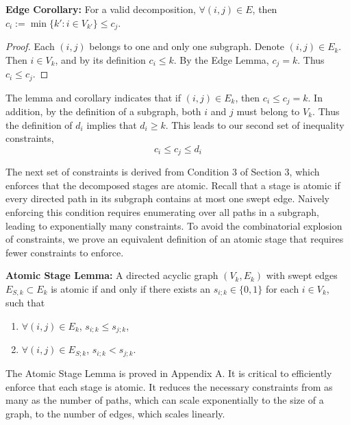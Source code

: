 \documentclass[review]{siamart0216}
\begin{document}
{\bf Edge Corollary:}  
For a valid decomposition,
$\forall (i,j)\in E$, then $c_i:=\min \{ k': i\in V_{k'}\}\le c_j$.

\begin{proof} Each $(i,j)$ belongs to one and only one subgraph.
Denote $(i,j)\in E_k$.  Then $i\in V_k$, and by its definition $c_i\le k$.
By the Edge Lemma, $c_j=k$.  Thus $c_i\le c_j$.
\end{proof}

The lemma and corollary indicates that if $(i,j)\in E_k$, then
$c_i\le c_j=k$.  In addition, by the definition of a subgraph,
both $i$ and $j$ must belong to $V_k$.  Thus the definition of $d_i$
implies that $d_i\ge k$.  This leads to our second set of inequality
constraints,
\begin{equation} \label{cond4}
    c_i \le c_j \le d_i
\end{equation}

The next set of constraints is derived from Condition 3 of Section 3,
which enforces that the decomposed stages are atomic.  Recall that a stage
is atomic if every directed path in its subgraph contains at most one
swept edge.  Naively enforcing this condition requires enumerating
over all paths in a subgraph, leading to exponentially many constraints.
To avoid the combinatorial explosion of constraints, we prove an equivalent
definition of an atomic stage that requires fewer constraints to enforce.

{\bf Atomic Stage Lemma:} 
A directed acyclic graph $(V_k, E_k)$ with swept edges $E_{S,k}\subset E_k$
is atomic if and only if there exists an $s_{i;k} \in \{0,1\}$ for each
$i\in V_k$,
such that
\begin{enumerate}
    \item $\forall (i,j)\in E_k$, $s_{i;k} \le s_{j;k}$,
    \item $\forall (i,j)\in E_{S;k}$, $s_{i;k} < s_{j;k}$.
\end{enumerate}

The Atomic Stage Lemma is proved in Appendix A.  It is critical to efficiently
enforce that each stage is atomic.  It reduces the necessary
constraints from as many as the number of paths, which can scale exponentially
to the size of a graph, to the number of edges, which scales linearly.
\end{document}
